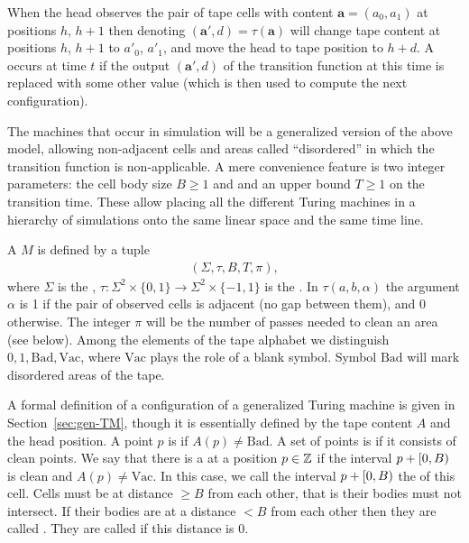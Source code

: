 \documentclass[11pt]{memoir}
\theoremstyle{definition} %
\renewcommand{\ge}{\geq}
\renewcommand{\vek}[1]{\mathbf{#1}}
\def\B{B}
\newcommand{\va}{\vek{a}} %
\newcommand{\h}{h} %
\newcommand{\passno}{\pi}
\newcommand{\Tu}{T}
\newcommand{\Bad}{\mathrm{Bad}}
\newcommand{\Vacant}{\mathrm{Vac}}
\begin{document}
When the head observes the pair of tape cells
with content \( \va=(a_{0},a_{1}) \) at positions \( \h \), \( \h+1 \) then denoting
\(  (\va',d)=\tau(\va)  \)
will change tape content at positions \( \h \), \( \h+1 \) to \( a'_{0} \), \( a'_{1} \),
and move the head to tape position to \( \h+d \).
A  occurs at time \( t \) if the output \( (\va',d) \)
of the    transition function at this time is replaced with some other value
(which is then used to compute the next configuration).

The machines that occur in simulation will be a generalized version of the above model,
allowing non-adjacent cells and areas called ``disordered''
in which the transition function is non-applicable.
A mere convenience feature is two integer parameters:
the cell body size \( \B\ge 1 \) and and an upper bound \( \Tu\ge 1 \) on the transition time.
These allow placing all the different Turing
machines in a hierarchy of simulations onto
the same linear space and the same time line.

\begin{definition}\label{def:gen-TM}
    A  \( M \) is defined by a tuple
        \begin{align}\label{eq:gen-TM}
             (\Sigma, \tau, \B, \Tu, \passno),
       \end{align}
       where \( \Sigma \) is the ,
       \(  \tau: \Sigma^{2}\times\{0,1\}\to \Sigma^{2}\times\{-1,1\}  \)
    is the .
    In  \( \tau(a,b,\alpha) \) the argument \( \alpha \) is 1 if the pair of observed cells is
    adjacent (no gap between them), and 0 otherwise.
The integer \( \passno \) will be the number of passes needed to clean an area (see below).
Among the elements of the tape alphabet
we distinguish \( 0,1,\Bad,\Vacant \), where \( \Vacant \) plays the role of a blank symbol.
Symbol \( \Bad \) will mark disordered areas of the tape.
\end{definition}

A formal definition of a configuration of a generalized Turing machine is given in
Section~\ref{sec:gen-TM}, though it is essentially defined by the tape content \( A \) and the head
position.
A point \( p \) is  if  \( A(p)\ne\Bad \).
A set of points is  if it consists of clean points.
We say that there is a  at a position \( p\in\mathbb{Z} \) if the interval
\( p+\lint{0}{\B} \) is clean and \( A(p)\ne \Vacant \).
In this case, we call the interval \( p+\lint{0}{\B} \) the  of this cell.
Cells must be at distance \( \ge\B \) from each other, that is their
bodies must not intersect.
If their bodies are at a distance \( <\B \) from each other then they are called .
They are called  if this distance is \( 0 \).
\end{document}
